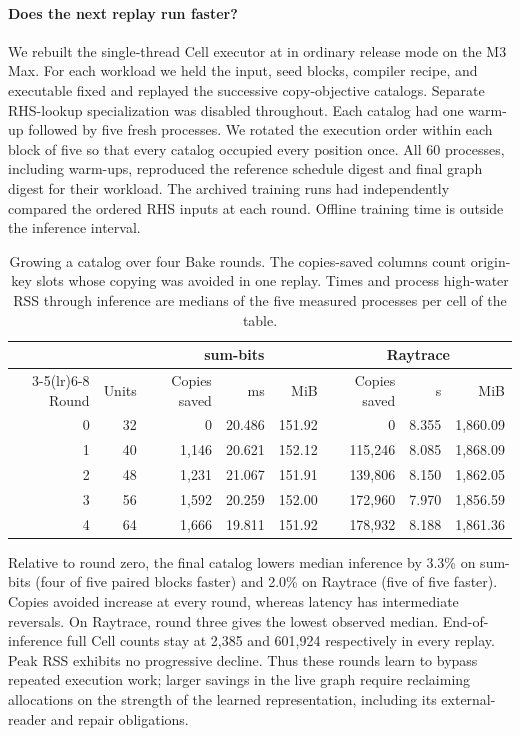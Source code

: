 \paragraph{Does the next replay run faster?}
We rebuilt the single-thread Cell executor at  in ordinary release mode on the M3 Max. For each workload we held the input, seed blocks, compiler recipe, and executable fixed and replayed the successive copy-objective catalogs. Separate RHS-lookup specialization was disabled throughout. Each catalog had one warm-up followed by five fresh processes. We rotated the execution order within each block of five so that every catalog occupied every position once. All 60 processes, including warm-ups, reproduced the reference schedule digest and final graph digest for their workload. The archived training runs had independently compared the ordered RHS inputs at each round. Offline training time is outside the inference interval.

\begin{table}[ht]
\centering
\caption{Growing a catalog over four Bake rounds. The copies-saved columns count origin-key slots whose copying was avoided in one replay. Times and process high-water RSS through inference are medians of the five measured processes per cell of the table.}
\label{tab:rounds}
\begin{tabular}{rr rrr rrr}
\toprule
& & \multicolumn{3}{c}{sum-bits} & \multicolumn{3}{c}{Raytrace}\\
\cmidrule(lr){3-5}\cmidrule(lr){6-8}
Round & Units & Copies saved & ms & MiB & Copies saved & s & MiB\\
\midrule
0 & 32 & 0     & 20.486 & 151.92 & 0       & 8.355 & 1,860.09\\
1 & 40 & 1,146 & 20.621 & 152.12 & 115,246 & 8.085 & 1,868.09\\
2 & 48 & 1,231 & 21.067 & 151.91 & 139,806 & 8.150 & 1,862.05\\
3 & 56 & 1,592 & 20.259 & 152.00 & 172,960 & 7.970 & 1,856.59\\
4 & 64 & 1,666 & 19.811 & 151.92 & 178,932 & 8.188 & 1,861.36\\
\bottomrule
\end{tabular}
\end{table}

Relative to round zero, the final catalog lowers median inference by 3.3\% on sum-bits (four of five paired blocks faster) and 2.0\% on Raytrace (five of five faster). Copies avoided increase at every round, whereas latency has intermediate reversals. On Raytrace, round three gives the lowest observed median. End-of-inference full Cell counts stay at 2,385 and 601,924 respectively in every replay. Peak RSS exhibits no progressive decline. Thus these rounds learn to bypass repeated execution work; larger savings in the live graph require reclaiming allocations on the strength of the learned representation, including its external-reader and repair obligations.


